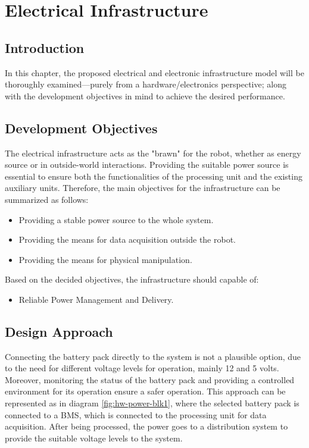 \newpage
\chapter{Electrical Infrastructure}

\section{Introduction}
\vspace{-2mm}
In this chapter, the proposed electrical and electronic infrastructure model will be thoroughly examined---purely from a hardware/electronics perspective; along with the development objectives in mind to achieve the desired performance.

\section{Development Objectives}
The electrical infrastructure acts as the "brawn" for the robot, whether as energy source or in outside-world interactions. Providing the suitable power source is essential to ensure both the functionalities of the processing unit and the existing auxiliary units. Therefore, the main objectives for the infrastructure can be summarized as follows:
\begin{itemize}
    \item Providing a stable power source to the whole system.
    \item Providing the means for data acquisition outside the robot.
    \item Providing the means for physical manipulation.
\end{itemize}
Based on the decided objectives, the infrastructure should capable of:
\begin{itemize}
    \item Reliable Power Management and Delivery. 
\end{itemize}

\vspace{-1mm}
\section{Design Approach}\label{sect:d_approach}
Connecting the battery pack directly to the system is not a plausible option, due to the need for different voltage levels for operation, mainly 12 and 5 volts. Moreover, monitoring the status of the battery pack and providing a controlled environment for its operation ensure a safer operation.
\newline This approach can be represented as in diagram \ref{fig:hw-power-blk1}, where the selected battery pack is connected to a BMS, which is connected to the processing unit for data acquisition. After being processed, the power goes to a distribution system to provide the suitable voltage levels to the system. 

